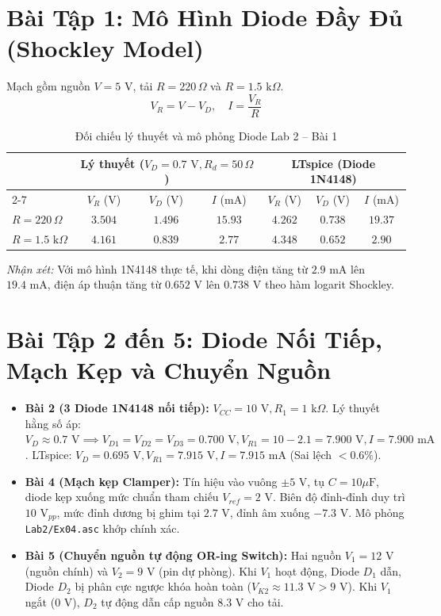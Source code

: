 \documentclass[12pt,a4paper]{report}
\begin{document}
\section{Bài Tập 1: Mô Hình Diode Đầy Đủ (Shockley Model)}
Mạch gồm nguồn $V = 5\text{ V}$, tải $R = 220\,\Omega$ và $R = 1.5\text{ k}\Omega$.
\begin{equation}
    V_R = V - V_D, \quad I = \frac{V_R}{R}
\end{equation}
\begin{table}[H]
\centering
\caption{Đối chiếu lý thuyết và mô phỏng Diode Lab 2 -- Bài 1}
\label{tab:ans_lab2_ex1}
\renewcommand{\arraystretch}{1.2}
\begin{tabular}{|l|c|c|c|c|c|c|}
\hline
\rowcolor{codebg}
& \multicolumn{3}{c|}{\textbf{Lý thuyết ($V_D=0.7\text{ V}, R_d=50\,\Omega$)}} & \multicolumn{3}{c|}{\textbf{LTspice (Diode 1N4148)}} \\ \cline{2-7}
\rowcolor{codebg}
& $V_R$ (V) & $V_D$ (V) & $I$ (mA) & $V_R$ (V) & $V_D$ (V) & $I$ (mA) \\ \hline
$R = 220\,\Omega$ & $3.504$ & $1.496$ & $15.93$ & $4.262$ & $0.738$ & $19.37$ \\ \hline
$R = 1.5\text{ k}\Omega$ & $4.161$ & $0.839$ & $2.77$ & $4.348$ & $0.652$ & $2.90$ \\ \hline
\end{tabular}
\end{table}
\textit{Nhận xét:} Với mô hình 1N4148 thực tế, khi dòng điện tăng từ $2.9\text{ mA}$ lên $19.4\text{ mA}$, điện áp thuận tăng từ $0.652\text{ V}$ lên $0.738\text{ V}$ theo hàm logarit Shockley.

\section{Bài Tập 2 đến 5: Diode Nối Tiếp, Mạch Kẹp và Chuyển Nguồn}
\begin{itemize}
    \item \textbf{Bài 2 (3 Diode 1N4148 nối tiếp):} $V_{CC} = 10\text{ V}, R_1 = 1\text{ k}\Omega$. Lý thuyết hằng số áp: $V_D \approx 0.7\text{ V} \implies V_{D1}=V_{D2}=V_{D3} = 0.700\text{ V}, V_{R1} = 10 - 2.1 = 7.900\text{ V}, I = 7.900\text{ mA}$. LTspice: $V_D = 0.695\text{ V}, V_{R1} = 7.915\text{ V}, I = 7.915\text{ mA}$ (Sai lệch $<0.6\%$).
    \item \textbf{Bài 4 (Mạch kẹp Clamper):} Tín hiệu vào vuông $\pm 5\text{ V}$, tụ $C = 10\mu\text{F}$, diode kẹp xuống mức chuẩn tham chiếu $V_{ref} = 2\text{ V}$. Biên độ đỉnh-đỉnh duy trì $10\text{ V}_{pp}$, mức đỉnh dương bị ghim tại $2.7\text{ V}$, đỉnh âm xuống $-7.3\text{ V}$. Mô phỏng \texttt{Lab2/Ex04.asc} khớp chính xác.
    \item \textbf{Bài 5 (Chuyển nguồn tự động OR-ing Switch):} Hai nguồn $V_1 = 12\text{ V}$ (nguồn chính) và $V_2 = 9\text{ V}$ (pin dự phòng). Khi $V_1$ hoạt động, Diode $D_1$ dẫn, Diode $D_2$ bị phân cực ngược khóa hoàn toàn ($V_{K2} \approx 11.3\text{ V} > 9\text{ V}$). Khi $V_1$ ngắt ($0\text{ V}$), $D_2$ tự động dẫn cấp nguồn $8.3\text{ V}$ cho tải.
\end{itemize}
\end{document}
